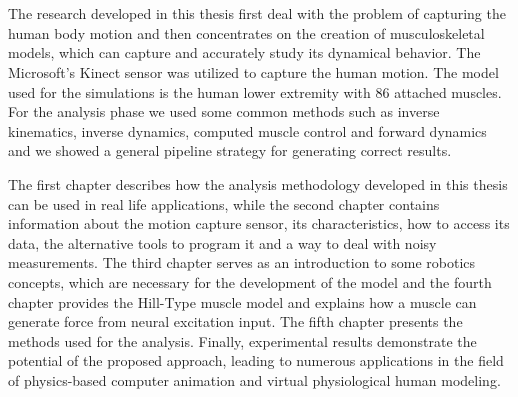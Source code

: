 \thispagestyle{empty}
\clearpage\mbox{}
\thispagestyle{empty}
\clearpage

\section*{\texorpdfstring{}{}}

\en
The research developed in this thesis first deal with the problem of capturing the human body motion and then concentrates on the creation of musculoskeletal models, which can capture and accurately study its dynamical behavior. The Microsoft's Kinect sensor was utilized to capture the human motion. The model used for the simulations is the human lower extremity with 86 attached muscles. For the analysis phase we used some common methods such as inverse kinematics, inverse dynamics, computed muscle control and forward dynamics and we showed a general pipeline strategy for generating correct results.

The first chapter describes how the analysis methodology developed in this thesis can be used in real life applications, while the second chapter contains information about the motion capture sensor, its characteristics, how to access its data, the alternative tools to program it and a way to deal with noisy measurements. The third chapter serves as an introduction to some robotics concepts, which are necessary for the development of the model and the fourth chapter provides the Hill-Type muscle model and explains how a muscle can generate force from neural excitation input. The fifth chapter presents the methods used for the analysis. Finally, experimental results demonstrate the potential of the proposed approach, leading to numerous applications in the field of physics-based computer animation and virtual physiological human modeling.
\gr

\vfill

\paragraph{\textbf{}}

\thispagestyle{empty}
\clearpage\mbox{}
\thispagestyle{empty}
